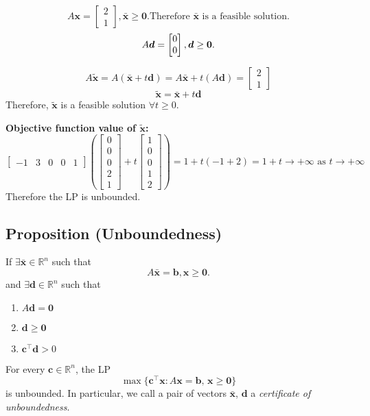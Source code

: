 \[
    A\bm{x}=
    \begin{bmatrix}
        2\\
        1
    \end{bmatrix}, \bar{\bm{x}}\ge \bm{0}.\text{Therefore $\bar{\bm{x}}$ is a feasible solution.}
\]
\[
    A\bm{d}=\begin{bmatrix}
        0\\
        0
    \end{bmatrix}, \bm{d}\ge \bm{0}.\\
\]

\[A\tilde{\bm{x}}=A(\bar{\bm{x}}+t\bm{d})=A\bar{\bm{x}}+t(A\bm{d})=
\begin{bmatrix}
    2\\
    1
\end{bmatrix}\]
\[\tilde{\bm{x}}=\bar{\bm{x}}+t\bm{d}\]
Therefore, $\tilde{\bm{x}}$ is a feasible solution $\forall t\ge 0$.


\textbf{Objective function value of $\tilde{\bm{x}}$:}
\[
\begin{bmatrix}
    -1 & 3 & 0 & 0 & 1
\end{bmatrix}
\left(\begin{bmatrix}
    0\\
    0\\
    0\\
    2\\
    1  
\end{bmatrix}
+
t
\begin{bmatrix}
    1\\
    0\\
    0\\
    1\\
    2
\end{bmatrix}\right)
=
1+t(-1+2)=1+t\rightarrow+\infty \text{ as }t\rightarrow+\infty\]
Therefore the LP is unbounded.


\begin{thmbox}
    \subsection{Proposition (Unboundedness)}
    If $\exists \bm{\bar{x}}\in\mathbb{R}^n$ such that
    \[A\bm{\bar{x}}=\bm{b}, \bm{x}\ge \bm{0}.\]
    and $\exists\bm{d}\in\mathbb{R}^n$ such that
    \begin{enumerate}[(1)]
        \item $A\bm{d}=\bm{0}$
        \item $\bm{d}\ge \bm{0}$
        \item $\bm{c}^\top \bm{d}>0$
    \end{enumerate}
    For every $\bm{c}\in\mathbb{R}^n$, the LP
    \[\max \{\bm{c}^\top \bm{x} : A\bm{x}=\bm{b},\,
    \bm{x}\ge\bm{0}\}\]
    is unbounded. In particular, we call a pair of vectors $\bm{\bar{x}}$, $\bm{d}$ a
    \emph{certificate of unboundedness}.
\end{thmbox}

